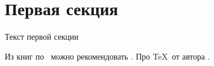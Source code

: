 \documentclass[russian,utf8]{eskdtext}
\begin{document}
\maketitle
\tableofcontents
\newpage
\section{Первая секция}
Текст первой секции

Из книг по \LaTeXe\ можно рекомендовать \cite{bib:cotelnikov,bib:baldin}. Про \TeX\ от автора \cite{bib:knuth:AllAbout}.




 
\end{document}
